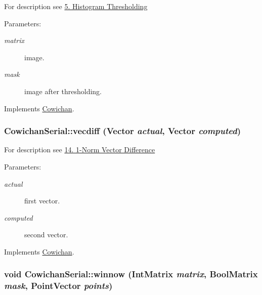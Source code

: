 For description see \hyperlink{index_thresh_sec}{5. Histogram Thresholding} \begin{Desc}
\item[Parameters:]
\begin{description}
\item[{\em matrix}]image. \item[{\em mask}]image after thresholding. \end{description}
\end{Desc}


Implements \hyperlink{class_cowichan_a0b633b8c1f21884e0998a9c7020c08c}{Cowichan}.\hypertarget{class_cowichan_serial_34b75a2084051b3677071bb3c334d1f4}{
\subsubsection[{vecdiff}]{ CowichanSerial::vecdiff ({\bf Vector} {\em actual}, \/  {\bf Vector} {\em computed})}}
\label{class_cowichan_serial_34b75a2084051b3677071bb3c334d1f4}


For description see \hyperlink{index_vecdiff_sec}{14. 1-Norm Vector Difference} \begin{Desc}
\item[Parameters:]
\begin{description}
\item[{\em actual}]first vector. \item[{\em computed}]second vector. \end{description}
\end{Desc}


Implements \hyperlink{class_cowichan_775d72b5e7d122f9f32555352278250e}{Cowichan}.\hypertarget{class_cowichan_serial_33daca65431f792c2f4f0e7f8d29fa01}{
\subsubsection[{winnow}]{\setlength{\rightskip}{0pt plus 5cm}void CowichanSerial::winnow ({\bf IntMatrix} {\em matrix}, \/  {\bf BoolMatrix} {\em mask}, \/  {\bf PointVector} {\em points})}}
\label{class_cowichan_serial_33daca65431f792c2f4f0e7f8d29fa01}


